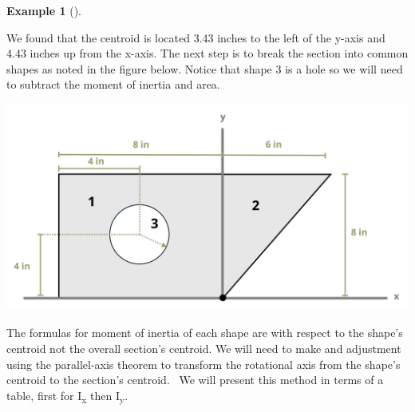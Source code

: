 \documentclass[
  letterpaper,
  DIV=11,
  numbers=noendperiod]{scrreprt}
\theoremstyle{definition}
\newtheorem{example}{Example}[chapter]
\theoremstyle{remark}
\begin{document}
\begin{tcolorbox}
\begin{example}[]
\begin{tcolorbox}
We found that the centroid is located 3.43 inches to the left of the
y-axis and 4.43 inches up from the x-axis. The next step is to break the
section into common shapes as noted in the figure below. Notice that
shape 3 is a hole so we will need to subtract the moment of inertia and
area.

\begin{center}
\includegraphics[width=5.67708in,height=\textheight]{images/CH 8 PNGs/example 8.6 part 3.png}
\end{center}

The formulas for moment of inertia of each shape are with respect to the
shape's centroid not the overall section's centroid. We will need to
make and adjustment using the parallel-axis theorem to transform the
rotational axis from the shape's centroid to the section's centroid.~ We
will present this method in terms of a table, first for
I\textsubscript{x} then I\textsubscript{y}.


\end{tcolorbox}
\end{example}
\end{tcolorbox}
\end{document}
